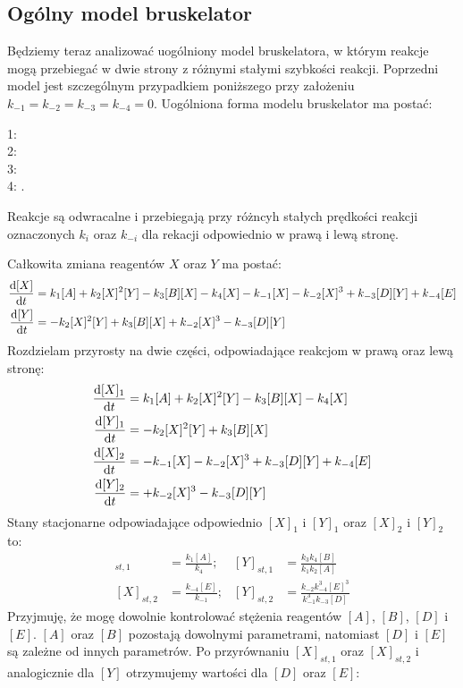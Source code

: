 \documentclass[10pt, a4paper, twoside, onecolumn]{article}
\numberwithin{equation}{section}
\begin{document}
	\subsection{Ogólny model bruskelator}\label{sec:ogolny_model_bruskelator}
	Będziemy teraz analizować uogólniony model bruskelatora, w którym reakcje mogą przebiegać w dwie strony z różnymi stałymi szybkości reakcji. Poprzedni model jest szczególnym przypadkiem poniższego przy założeniu \(k_{-1}=k_{-2}=k_{-3}=k_{-4}=0\). 
	Uogólniona forma modelu bruskelator ma postać:
	\begin{center}
		1:  \\
		2:  \\
		3:  \\
		4: .
	\end{center}
	Reakcje są odwracalne i przebiegają przy różncyh stałych prędkości reakcji oznaczonych \(k_{i}\) oraz \(k_{-i}\) dla rekacji odpowiednio w prawą i lewą stronę. \par
	Całkowita zmiana reagentów \(X\) oraz \(Y\) ma postać:
	\begin{align}
		\dv{[X]}{t} &= k_{1}[A] + k_{2}[X]^{2}[Y] - k_{3}[B][X] - k_{4}[X] - k_{-1}[X] - k_{-2}[X]^{3} + k_{-3}[D][Y] + k_{-4}[E] \\
		\dv{[Y]}{t} &= - k_{2}[X]^{2}[Y] + k_{3}[B][X] + k_{-2}[X]^{3} - k_{-3}[D][Y]
	\end{align}
	Rozdzielam przyrosty na dwie części, odpowiadające reakcjom w prawą oraz lewą stronę:
	\begin{align}
		\dv{[X]_{1}}{t} &= k_{1}[A] + k_{2}[X]^{2}[Y] - k_{3}[B][X] - k_{4}[X] \\
		\dv{[Y]_{1}}{t} &= - k_{2}[X]^{2}[Y] + k_{3}[B][X] \\
		\dv{[X]_{2}}{t} &= - k_{-1}[X] - k_{-2}[X]^{3} + k_{-3}[D][Y] + k_{-4}[E] \\
		\dv{[Y]_{2}}{t} &= + k_{-2}[X]^{3} - k_{-3}[D][Y]
	\end{align}
	Stany stacjonarne odpowiadające odpowiednio \([X]_{1}\) i \([Y]_{1}\) oraz \([X]_{2}\) i \([Y]_{2}\) to:
	\begin{align}
		[X]_{st, 1} &= \frac{k_{1}[A]}{k_{4}}; & [Y]_{st, 1} &= \frac{k_{3}k_{4}[B]}{k_{1}k_{2}[A]} \\
		[X]_{st, 2} &= \frac{k_{-4}[E]}{k_{-1}}; & [Y]_{st, 2} &= \frac{k_{-2}k_{-4}^{3}[E]^{3}}{k_{-1}^{3}k_{-3}[D]}
	\end{align}
	Przyjmuję, że mogę dowolnie kontrolować stężenia reagentów \([A]\), \([B]\), \([D]\) i \([E]\). \([A]\) oraz \([B]\) pozostają dowolnymi parametrami, natomiast \([D]\) i \([E]\) są zależne od innych parametrów. Po przyrównaniu \([X]_{st, 1}\) oraz \([X]_{st, 2}\) i analogicznie dla \([Y]\) otrzymujemy wartości dla \([D]\) oraz \([E]\):
\end{document}

